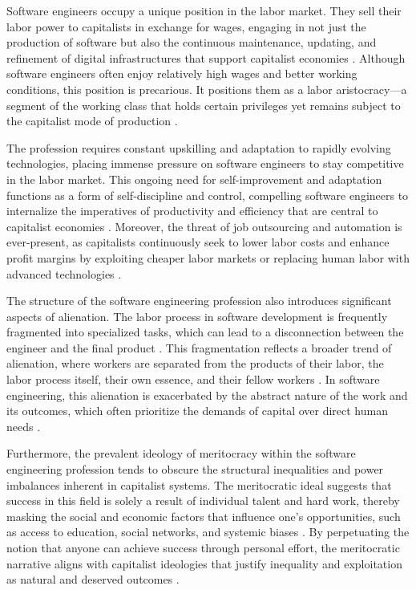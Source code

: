 \begin{refsection}
Software engineers occupy a unique position in the labor market. They sell their labor power to capitalists in exchange for wages, engaging in not just the production of software but also the continuous maintenance, updating, and refinement of digital infrastructures that support capitalist economies \cite[pp.~35-39]{braverman1974labor}. Although software engineers often enjoy relatively high wages and better working conditions, this position is precarious. It positions them as a labor aristocracy—a segment of the working class that holds certain privileges yet remains subject to the capitalist mode of production \cite[pp.~96-99]{engels1987condition}.

The profession requires constant upskilling and adaptation to rapidly evolving technologies, placing immense pressure on software engineers to stay competitive in the labor market. This ongoing need for self-improvement and adaptation functions as a form of self-discipline and control, compelling software engineers to internalize the imperatives of productivity and efficiency that are central to capitalist economies \cite[pp.~118-122]{braverman1974labor}. Moreover, the threat of job outsourcing and automation is ever-present, as capitalists continuously seek to lower labor costs and enhance profit margins by exploiting cheaper labor markets or replacing human labor with advanced technologies \cite[pp.~286-289]{marx2008capital}.

The structure of the software engineering profession also introduces significant aspects of alienation. The labor process in software development is frequently fragmented into specialized tasks, which can lead to a disconnection between the engineer and the final product \cite[pp.~482-485]{marx2008capital}. This fragmentation reflects a broader trend of alienation, where workers are separated from the products of their labor, the labor process itself, their own essence, and their fellow workers \cite[pp.~74-78]{marx2008capital}. In software engineering, this alienation is exacerbated by the abstract nature of the work and its outcomes, which often prioritize the demands of capital over direct human needs \cite[pp.~150-154]{engels1987condition}.

Furthermore, the prevalent ideology of meritocracy within the software engineering profession tends to obscure the structural inequalities and power imbalances inherent in capitalist systems. The meritocratic ideal suggests that success in this field is solely a result of individual talent and hard work, thereby masking the social and economic factors that influence one's opportunities, such as access to education, social networks, and systemic biases \cite[pp.~94-97]{braverman1974labor}. By perpetuating the notion that anyone can achieve success through personal effort, the meritocratic narrative aligns with capitalist ideologies that justify inequality and exploitation as natural and deserved outcomes \cite[pp.~122-124]{braverman1974labor}.


\end{refsection}
